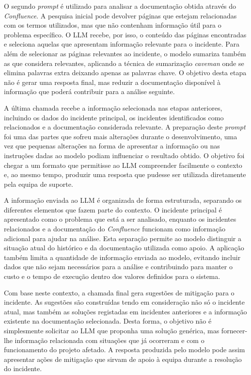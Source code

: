 		O segundo \textit{prompt} é utilizado para analisar a documentação obtida através do \textit{Confluence}. A pesquisa inicial pode devolver páginas que estejam relacionadas com os termos utilizados, mas que não contenham informação útil para o problema específico. O \gls{LLM} recebe, por isso, o conteúdo das páginas encontradas e seleciona aquelas que apresentam informação relevante para o incidente. Para além de selecionar as páginas relevantes ao incidente, o modelo sumariza também as que considera relevantes, aplicando a técnica de sumarização \textit{caveman} onde se elimina palavras extra deixando apenas as palavras chave. O objetivo desta etapa não é gerar uma resposta final, mas reduzir a documentação disponível à informação que poderá contribuir para a análise seguinte.
		
		A última chamada recebe a informação selecionada nas etapas anteriores, incluindo os dados do incidente principal, os incidentes identificados como relacionados e a documentação considerada relevante. A preparação deste \textit{prompt} foi uma das partes que sofreu mais alterações durante o desenvolvimento, uma vez que pequenas alterações na forma de apresentar a informação ou nas instruções dadas ao modelo podiam influenciar o resultado obtido. O objetivo foi chegar a um formato que permitisse ao \gls{LLM} compreender facilmente o contexto e, ao mesmo tempo, produzir uma resposta que pudesse ser utilizada diretamente pela equipa de suporte. 
		
		A informação enviada ao \gls{LLM} é organizada de forma estruturada, separando os diferentes elementos que fazem parte do contexto. O incidente principal é apresentado como o problema que está a ser analisado, enquanto os incidentes relacionados e a documentação do \textit{Confluence} funcionam como informação adicional para ajudar na análise. Esta separação permite ao modelo distinguir a situação atual do histórico e da documentação utilizada como apoio. A aplicação também limita a quantidade de informação enviada ao modelo, evitando incluir dados que não sejam necessários para a análise e contribuindo para manter o custo e o tempo de execução dentro dos valores definidos para o sistema.
		
		Com base neste contexto, a chamada final gera sugestões de mitigação para o incidente. As sugestões são construídas tendo em consideração não só o incidente atual, mas também as soluções registadas em incidentes anteriores e a informação existente na documentação selecionada. Desta forma, o objetivo não é simplesmente solicitar ao \gls{LLM} que proponha uma solução genérica, mas fornecer-lhe informação relacionada com situações que já ocorreram e com o funcionamento do projeto afetado. A resposta produzida pelo modelo pode assim apresentar ações de mitigação que sirvam de apoio à equipa durante a resolução do incidente.
		
